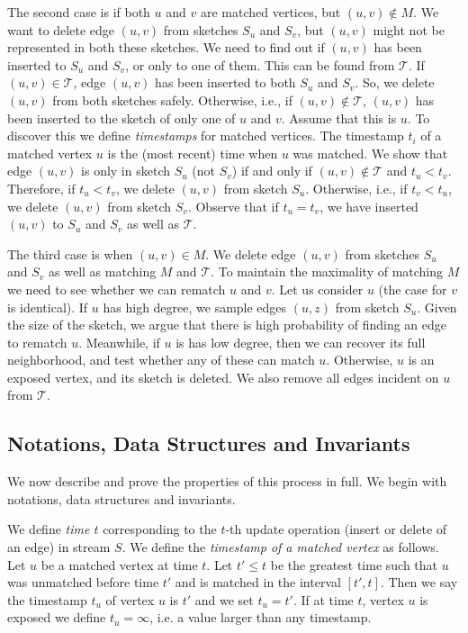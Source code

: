 \documentclass[11pt,letter]{article}
\renewcommand{\paragraph}[1]{\medskip \noindent {\bf #1}}
\begin{document}
The second case is if both $u$ and $v$ are matched vertices,
but $(u,v)\notin M$.  We want to delete edge $(u,v)$ from sketches
$S_u$ and $S_v$, but $(u,v)$ might not be represented in both these sketches.
We need to find out if $(u,v)$ has been inserted to $S_u$ and $S_v$,
or only to one of them.
This can be found from $\mathcal{T}$.
If $(u,v)\in \mathcal{T}$, edge $(u,v)$ has been inserted to both $S_u$ and $S_v$.
So, we delete $(u,v)$ from both sketches safely.
Otherwise, i.e., if $(u,v)\notin \mathcal{T}$, $(u,v)$ has been
inserted to the sketch of only one of $u$ and $v$.
Assume that this is $u$.
To discover this we define {\em timestamps} for matched vertices.
The timestamp $t_i$ of a matched vertex $u$ is the (most recent) time
when $u$ was matched.
We show that edge $(u,v)$ is only in sketch $S_u$ (not $S_v$)
if and only if $(u,v)\notin \mathcal{T}$ and $t_u<t_v$.
Therefore, if $t_u<t_v$, we delete $(u,v)$ from sketch $S_u$.
Otherwise, i.e., if $t_v<t_u$, we delete $(u,v)$ from sketch $S_v$.
Observe that if $t_u=t_v$, we have inserted $(u,v)$ to $S_u$ and
$S_v$ as well as $\mathcal{T}$.





The third case
is when $(u,v)\in M$.
We delete edge $(u,v)$ from sketches $S_u$ and $S_v$ as well as matching $M$ and $\mathcal{T}$.
To maintain the maximality of matching $M$ we need to see whether
we can rematch $u$ and $v$.
Let us consider $u$ (the case for $v$ is identical).
If $u$ has high degree,
we sample edges $(u,z)$ from sketch $S_u$.
Given the size of the sketch, we argue that there is high probability
of finding an edge to rematch $u$.
Meanwhile, if $u$ is has low degree, then we can recover its full
neighborhood, and test whether any of these can match $u$.
Otherwise,
 $u$ is an exposed vertex, and its sketch is deleted.
We also remove all edges incident on $u$ from $\mathcal{T}$.




\subsection{Notations, Data Structures and Invariants}

We now describe and prove the properties of this process in full.
We begin with notations, data structures and invariants.

\paragraph{Timestamp of a Vertex and an Edge.}
We define \textit{time $t$} corresponding to the $t$-th update
operation (insert or delete of an edge) in stream $S$.
We define the {\em timestamp of a matched vertex} as follows.
Let $u$ be a matched vertex at time $t$.
Let $t'\le t$ be the greatest time such that $u$ was unmatched before
time $t'$ and is matched in the interval $[t',t]$.
Then we say the timestamp $t_u$ of vertex $u$ is $t'$ and we set
$t_u=t'$.
If at time $t$, vertex $u$ is exposed we define $t_u=\infty$,
i.e. a value larger than any timestamp.
\end{document}
